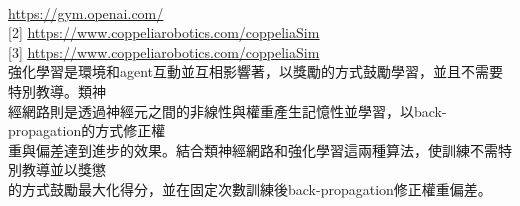 \begin{flushleft}
{\large {}}\\
\end{flushleft}
\begin{flushleft}\sectionef
[1]\hspace{1em}\href{https://gym.openai.com/}{\underline{https://gym.openai.com/}}\\[12pt]

[2]\hspace{1em} \href{https://www.coppeliarobotics.com/coppeliaSim}{\underline{https://www.coppeliarobotics.com/coppeliaSim}}\\[12pt]


[3]\hspace{1em} \href{https://www.coppeliarobotics.com/coppeliaSim}{\underline{https://www.coppeliarobotics.com/coppeliaSim}} \\[12pt]
\hspace{2.25em}強化學習是環境和agent互動並互相影響著，以獎勵的方式鼓勵學習，並且不需要特別教導。類神\\
\hspace{2.25em}經網路則是透過神經元之間的非線性與權重產生記憶性並學習，以back-propagation的方式修正權\\
\hspace{2.25em}重與偏差達到進步的效果。結合類神經網路和強化學習這兩種算法，使訓練不需特別教導並以獎懲\\
\hspace{2.25em}的方式鼓勵最大化得分，並在固定次數訓練後back-propagation修正權重偏差。\\[12pt]

\iffalse
\parbox[t][5pt][l]{25pt}{[3]}
\begin{minipage}[t]{15pt}
  \underline{https://gym.openai.com/}
\end{minipage}

\makebox[25pt][l]{[3]}\makebox[45pt][l]{\raisebox{-3ex}[5\height]{\underline{https://gym.openai.com/}https://gym.openai.com/https://gym.openai.com/https://gym.openai.com/https://gym.openai.com/https://gym.openai.com/https://gym.openai.com/}}

\makebox[25pt][l]{[3]}\makebox[45pt][l]{\raisebox{-3ex}[5\height]{\underline{https://gym.openai.com/}}}
\fi
\end{flushleft}
